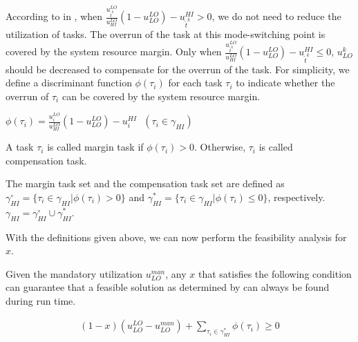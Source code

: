 \documentclass[10pt,journal,compsoc]{IEEEtran}
\begin{document}
According to  in , when $\frac{u_{\hat{t}^k}^{LO}}{u_{HI}^{LO}}(1-u_{LO}^{LO})-u_{\hat{t}^k}^{HI}>{0}$, we do not need to reduce the utilization of \lo tasks. The overrun of the \hi task at this mode-switching point is covered by the system resource margin. Only when $\frac{u_{\hat{t}^k}^{LO}}{u_{HI}^{LO}}(1-u_{LO}^{LO})-u_{\hat{t}^k}^{HI}\le{0}$, $u_{LO}^{k}$ should be decreased to compensate for the overrun of the \hi task. For simplicity, we define a discriminant function $\phi(\tau_i)$ for each \hi task $\tau_i$ to indicate whether the overrun of $\tau_i$ can be covered by the system resource margin.    
\begin{definition}
\label{def:3}
 $\phi(\tau_i)=\frac{u_{i}^{LO}}{u_{HI}^{LO}}(1-u_{LO}^{LO})-u_{i}^{HI}\ \ \ (\tau_i\in\gamma_{HI})$
\end{definition}  

\begin{definition}
\label{def:4}
A \hi task $\tau_i$ is called margin \hi task if $\phi(\tau_i)>0$. Otherwise, $\tau_i$ is called compensation  \hi task.    
\end{definition}

\begin{definition}
\label{def:5}
The margin \hi task set and the compensation \hi task set are defined as $\gamma_{HI}^{\circ}=\{\tau_i\in\gamma_{HI}|\phi(\tau_i)>{0}\}$ and $\gamma_{HI}^{\ast}=\{\tau_i\in\gamma_{HI}|\phi(\tau_i)\le{0}\}$, respectively. $\gamma_{HI}= \gamma_{HI}^{\circ} \cup \gamma_{HI}^{\ast}$.    
\end{definition}   

With the definitions given above, we can now perform the feasibility analysis for $x$.  
\begin{theorem}
\label{thm:5}
Given the mandatory utilization $u_{LO}^{man}$, any $x$ that satisfies the following condition can guarantee that a feasible solution as determined by  can always be found during run time.  
\begin{footnotesize}  
\begin{align}
\label{eq:thm5:m0}
(1-x)(u_{LO}^{LO}-u_{LO}^{man})+\sum\limits_{\tau_{i}\in{\gamma_{HI}^{\ast}}}\phi(\tau_i)\ge{}0
\end{align}
\end{footnotesize} 
\end{theorem}
\end{document}
